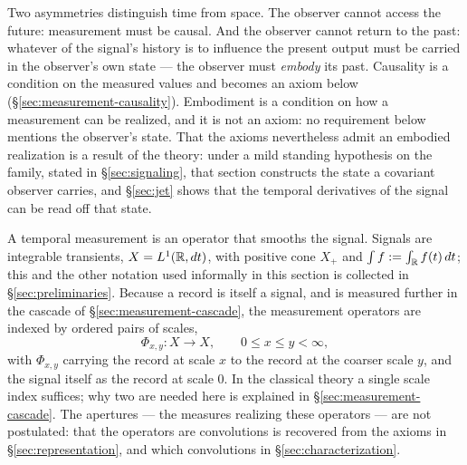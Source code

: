 Two asymmetries distinguish time from space. The observer cannot access the future:
measurement must be causal. And the observer cannot return to the past: whatever of the
signal's history is to influence the present output must be carried in the observer's own
state --- the observer must \emph{embody} its past. Causality is a condition on the
measured values and becomes an axiom below (\S\ref{sec:measurement-causality}).
Embodiment is a condition on how a measurement can be realized, and it is not an axiom:
no requirement below mentions the observer's state. That the axioms nevertheless admit an
embodied realization is a result of the theory: under a mild standing hypothesis on the
family, stated in \S\ref{sec:signaling}, that section constructs the state a covariant
observer carries, and \S\ref{sec:jet} shows that the temporal derivatives of the signal
can be read off that state.

A temporal measurement is an operator that smooths the signal. Signals are integrable
transients, $X = L^1(\mathbb{R}, dt)$, with positive cone $X_+$ and $\int f := \int_{\mathbb{R}} f(t)\,dt$; this
and the other notation used informally in this section is collected in
\S\ref{sec:preliminaries}.
Because a record is itself a signal, and is measured further in the cascade of
\S\ref{sec:measurement-cascade}, the measurement operators are indexed by ordered pairs
of scales,
\[
  \Phi_{x,y} : X \to X, \qquad 0 \le x \le y < \infty,
\]
with $\Phi_{x,y}$ carrying the record at scale $x$ to the record at the coarser scale
$y$, and the signal itself as the record at scale $0$. In the classical theory a single
scale index suffices; why two are needed here is explained in
\S\ref{sec:measurement-cascade}. The apertures --- the measures realizing these
operators --- are not postulated: that the operators are convolutions is recovered from
the axioms in \S\ref{sec:representation}, and which convolutions in
\S\ref{sec:characterization}.

